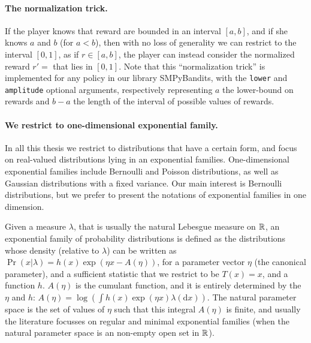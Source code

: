 \paragraph{The normalization trick.}\label{par:2:normalizationTrick}
%
If the player knows that reward are bounded in an interval $[a,b]$, and if she knows $a$ and $b$ (for $a<b$), then with no loss of generality we can restrict to the interval $[0,1]$, as if $r\in[a,b]$, the player can instead consider the normalized reward $r' = $ that lies in $[0,1]$.
Note that this ``normalization trick'' is implemented for any policy in our library SMPyBandits, with the \texttt{lower} and \texttt{amplitude} optional arguments, respectively representing $a$ the lower-bound on rewards and $b-a$ the length of the interval of possible values of rewards.


\paragraph{We restrict to one-dimensional exponential family.}
%

In all this thesis we restrict to distributions that have a certain form, and focus on real-valued distributions lying in an exponential families.
One-dimensional exponential families include Bernoulli and Poisson distributions, as well as Gaussian distributions with a fixed variance.
Our main interest is Bernoulli distributions, but we prefer to present the notations of exponential families in one dimension.

Given a measure $\lambda$, that is usually the natural Lebesgue measure on $\mathbb{R}$, an exponential family of probability distributions is defined as the distributions whose density (relative to $\lambda$) can be written as
$ \Pr(x | \lambda) = h(x) \exp \left( \eta x - A(\eta) \right)$,
for a parameter vector $\eta$ (the canonical parameter), and a sufficient statistic that we restrict to be $T(x)=x$, and a function $h$.
$A(\eta)$ is the cumulant function, and it is entirely determined by the $\eta$ and $h$:
$A(\eta) = \log \left( \int h(x) \exp(\eta x) \lambda(\mathrm{d} x) \right)$.
%
The natural parameter space is the set of values of $\eta$ such that this integral $A(\eta)$ is finite,
and usually the literature focusses on regular and minimal exponential families (when the natural parameter space is an non-empty open set in $\mathbb{R}$).

